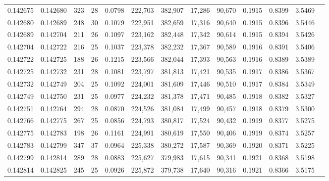 \begin{tabular}{rrrrrrrrrrrrr}
0.142675 & 0.142680 & 323 &  28 &                                     0.0798 & 222,703 & 382,907 &  17,286 &  90,670 & 0.1915 & 0.8399 & 3.5469 \\
0.142680 & 0.142689 & 248 &  30 &                                     0.1079 & 222,951 & 382,659 &  17,316 &  90,640 & 0.1915 & 0.8396 & 3.5446 \\
0.142689 & 0.142704 & 211 &  26 &                                     0.1097 & 223,162 & 382,448 &  17,342 &  90,614 & 0.1915 & 0.8394 & 3.5426 \\
0.142704 & 0.142722 & 216 &  25 &                                     0.1037 & 223,378 & 382,232 &  17,367 &  90,589 & 0.1916 & 0.8391 & 3.5406 \\
0.142722 & 0.142725 & 188 &  26 &                                     0.1215 & 223,566 & 382,044 &  17,393 &  90,563 & 0.1916 & 0.8389 & 3.5389 \\
0.142725 & 0.142732 & 231 &  28 &                                     0.1081 & 223,797 & 381,813 &  17,421 &  90,535 & 0.1917 & 0.8386 & 3.5367 \\
0.142732 & 0.142749 & 204 &  25 &                                     0.1092 & 224,001 & 381,609 &  17,446 &  90,510 & 0.1917 & 0.8384 & 3.5349 \\
0.142749 & 0.142750 & 231 &  25 &                                     0.0977 & 224,232 & 381,378 &  17,471 &  90,485 & 0.1918 & 0.8382 & 3.5327 \\
0.142751 & 0.142764 & 294 &  28 &                                     0.0870 & 224,526 & 381,084 &  17,499 &  90,457 & 0.1918 & 0.8379 & 3.5300 \\
0.142766 & 0.142775 & 267 &  25 &                                     0.0856 & 224,793 & 380,817 &  17,524 &  90,432 & 0.1919 & 0.8377 & 3.5275 \\
0.142775 & 0.142783 & 198 &  26 &                                     0.1161 & 224,991 & 380,619 &  17,550 &  90,406 & 0.1919 & 0.8374 & 3.5257 \\
0.142783 & 0.142799 & 347 &  37 &                                     0.0964 & 225,338 & 380,272 &  17,587 &  90,369 & 0.1920 & 0.8371 & 3.5225 \\
0.142799 & 0.142814 & 289 &  28 &                                     0.0883 & 225,627 & 379,983 &  17,615 &  90,341 & 0.1921 & 0.8368 & 3.5198 \\
0.142814 & 0.142825 & 245 &  25 &                                     0.0926 & 225,872 & 379,738 &  17,640 &  90,316 & 0.1921 & 0.8366 & 3.5175 \\

\end{tabular}
